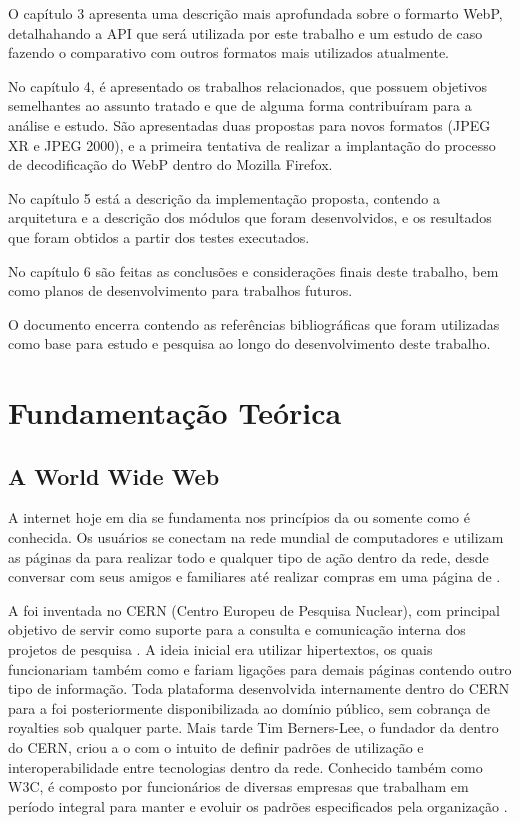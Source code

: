 \documentclass[espaco=simples,appendix=Name]{abnt}
\begin{document}
O capítulo 3 apresenta uma descrição mais aprofundada sobre o formarto WebP, detalhahando a API que será utilizada por este trabalho e um estudo de caso fazendo o comparativo com outros formatos mais utilizados atualmente.

No capítulo 4, é apresentado os trabalhos relacionados, que possuem objetivos semelhantes ao assunto tratado e que de alguma forma contribuíram para a análise e estudo. São apresentadas duas propostas para novos formatos (JPEG XR e JPEG 2000), e a primeira tentativa de realizar a implantação do processo de decodificação do WebP dentro do Mozilla Firefox. 

No capítulo 5 está a descrição da implementação proposta, contendo a arquitetura e a descrição dos módulos que foram desenvolvidos, e os resultados que foram obtidos a partir dos testes executados. 

No capítulo 6 são feitas as conclusões e considerações finais deste trabalho, bem como planos de desenvolvimento para trabalhos futuros. 

O documento encerra contendo as referências bibliográficas que foram utilizadas como base para estudo e pesquisa ao longo do desenvolvimento deste trabalho.

\chapter{Fundamentação Teórica}

\section{A World Wide Web}

A internet hoje em dia se fundamenta nos princípios da  ou somente  como é conhecida. Os usuários se conectam na rede mundial de computadores e utilizam as páginas da  para realizar todo e qualquer tipo de ação dentro da rede, desde conversar com seus amigos e familiares até realizar compras em uma página de .

A  foi inventada no CERN (Centro Europeu de Pesquisa Nuclear), com principal objetivo de servir como suporte para a consulta e comunicação interna dos projetos de pesquisa \cite{WebStory}. A ideia inicial era utilizar hipertextos, os quais funcionariam também como  e fariam ligações para demais páginas contendo outro tipo de informação. Toda plataforma desenvolvida internamente dentro do CERN para a  foi posteriormente disponibilizada ao domínio público, sem cobrança de royalties sob qualquer parte. Mais tarde Tim Berners-Lee, o fundador da  dentro do CERN, criou a o  com o intuito de definir padrões de utilização e interoperabilidade entre tecnologias dentro da rede. Conhecido também como W3C, é composto por funcionários de diversas empresas que trabalham em período integral para manter e evoluir os padrões especificados pela organização \cite{W3Cfacts}.
\end{document}
